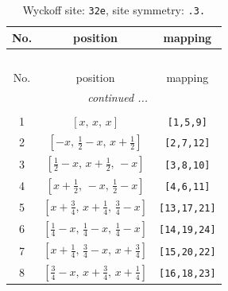 \documentclass[fleqn,8pt]{jsarticle}
\begin{document}
\renewcommand{\arraystretch}{1.2}
\begin{longtable}{ccc}
\caption{Wyckoff site: {\tt 32e}, site symmetry: {\tt .3.}}
 \\
 \hline \hline
No. & position & mapping \\ \hline \endfirsthead

\multicolumn{2}{l}{\tablename\ \thetable{}} \\
 \hline \hline
No. & position & mapping \\ \hline \endhead

 \hline \hline
\multicolumn{2}{r}{\footnotesize\it continued ...} \\ \endfoot

 \hline \hline
\multicolumn{2}{r}{} \\ \endlastfoot

1 & $\left[ x,\, x,\, x \right]$ & {\tt [1,5,9]} \\ \hline
2 & $\left[ - x,\, \frac{1}{2} - x,\, x + \frac{1}{2} \right]$ & {\tt [2,7,12]} \\ \hline
3 & $\left[ \frac{1}{2} - x,\, x + \frac{1}{2},\, - x \right]$ & {\tt [3,8,10]} \\ \hline
4 & $\left[ x + \frac{1}{2},\, - x,\, \frac{1}{2} - x \right]$ & {\tt [4,6,11]} \\ \hline
5 & $\left[ x + \frac{3}{4},\, x + \frac{1}{4},\, \frac{3}{4} - x \right]$ & {\tt [13,17,21]} \\ \hline
6 & $\left[ \frac{1}{4} - x,\, \frac{1}{4} - x,\, \frac{1}{4} - x \right]$ & {\tt [14,19,24]} \\ \hline
7 & $\left[ x + \frac{1}{4},\, \frac{3}{4} - x,\, x + \frac{3}{4} \right]$ & {\tt [15,20,22]} \\ \hline
8 & $\left[ \frac{3}{4} - x,\, x + \frac{3}{4},\, x + \frac{1}{4} \right]$ & {\tt [16,18,23]} \\
\end{longtable}
\renewcommand{\arraystretch}{1.2}
\end{document}

